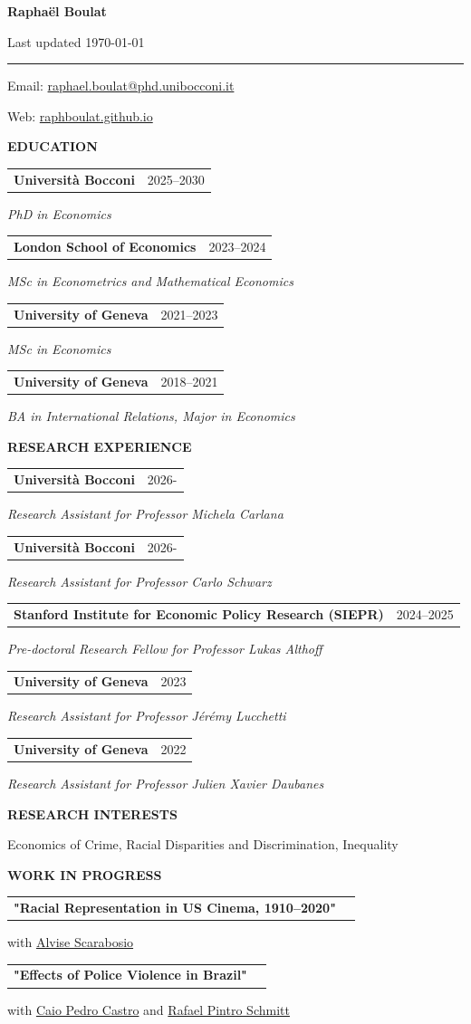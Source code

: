 \documentclass[10.5pt]{article}
\makeatletter
\newcommand{\cvsection}[1]{%
    \vspace{0.9em}
    {\normalsize\bfseries\MakeUppercase{#1}}\par
    \vspace{0.3em}
}
\newcommand{\cventry}[3]{%
    \noindent
    \begin{tabular*}{\textwidth}{@{\extracolsep{\fill}} l r}
        {\bfseries\color{cvblue} #1} & #2 \\
    \end{tabular*}
    \textit{#3}\par
    \vspace{0.2em}
}
\makeatother
\begin{document}
\noindent
\begin{minipage}[t]{0.7\textwidth}
    {\fontsize{20}{22}\selectfont\bfseries\color{cvblue} Rapha\"el Boulat}
\end{minipage}%
\begin{minipage}[t]{0.3\textwidth}
    \raggedleft
    \small Last updated \today
\end{minipage}

\vspace{0.2em}
\hrule
\vspace{0.4em}

\small
Email: \href{mailto:raphael.boulat@phd.unibocconi.it}{raphael.boulat@phd.unibocconi.it}

Web: \href{https://raphboulat.github.io/}{raphboulat.github.io}
\normalsize

\cvsection{Education}

\cventry{Università Bocconi}{2025--2030}{PhD in Economics}
\cventry{London School of Economics}{2023--2024}{MSc in Econometrics and Mathematical Economics}
\cventry{University of Geneva}{2021--2023}{MSc in Economics}
\cventry{University of Geneva}{2018--2021}{BA in International Relations, Major in Economics}

\cvsection{Research Experience}
\cventry{Università Bocconi}{2026-}
{Research Assistant for Professor Michela Carlana}
\cventry{Università Bocconi}{2026-}
{Research Assistant for Professor Carlo Schwarz}
\cventry{Stanford Institute for Economic Policy Research (SIEPR)}{2024--2025}
{Pre-doctoral Research Fellow for Professor Lukas Althoff}
\cventry{University of Geneva}{2023}
{Research Assistant for Professor J\'er\'emy Lucchetti}
\cventry{University of Geneva}{2022}
{Research Assistant for Professor Julien Xavier Daubanes}

\cvsection{Research Interests}

Economics of Crime, Racial Disparities and Discrimination, Inequality

\cvsection{Work in Progress}

\cventry{"Racial Representation in US Cinema, 1910–2020" }{}{}
with \href{https://alvisescarabosio.github.io/}{Alvise Scarabosio} \\

\cventry{"Effects of Police Violence in Brazil"}{}{}
with \href{https://www.caiopedrocastro.com/}{Caio Pedro Castro} and \href{https://rafaelpintroschmitt.github.io/}{Rafael Pintro Schmitt} \\
\end{document}
